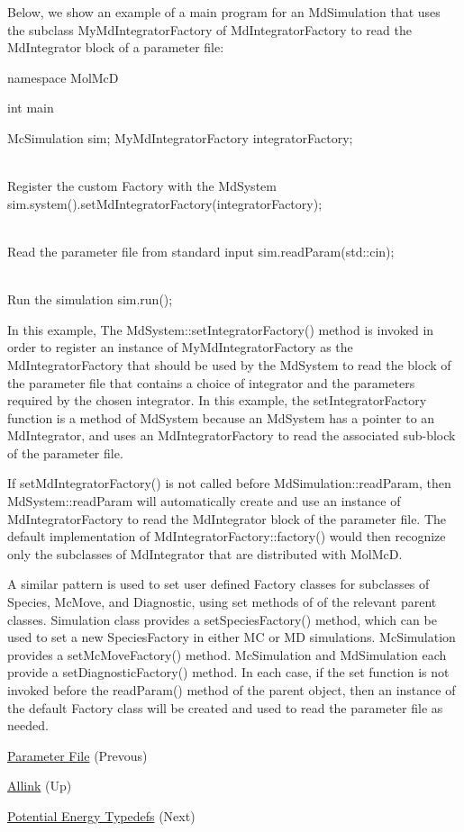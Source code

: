 \-Below, we show an example of a main program for an \-Md\-Simulation that uses the subclass \-My\-Md\-Integrator\-Factory of \-Md\-Integrator\-Factory to read the \-Md\-Integrator block of a parameter file\-: 
\begin{DoxyCode}
namespace MolMcD
{

   int main 
   {
      McSimulation          sim;
      MyMdIntegratorFactory integratorFactory;
 
      \\ Register the custom Factory with the MdSystem
      sim.system().setMdIntegratorFactory(integratorFactory);

      \\ Read the parameter file from standard input
      sim.readParam(std::cin);
  
      \\ Run the simulation
      sim.run();
  
   }

}
\end{DoxyCode}
 \-In this example, \-The \-Md\-System\-::set\-Integrator\-Factory() method is invoked in order to register an instance of \-My\-Md\-Integrator\-Factory as the \-Md\-Integrator\-Factory that should be used by the \-Md\-System to read the block of the parameter file that contains a choice of integrator and the parameters required by the chosen integrator. \-In this example, the set\-Integrator\-Factory function is a method of \-Md\-System because an \-Md\-System has a pointer to an \-Md\-Integrator, and uses an \-Md\-Integrator\-Factory to read the associated sub-\/block of the parameter file.

\-If set\-Md\-Integrator\-Factory() is not called before \-Md\-Simulation\-::read\-Param, then \-Md\-System\-::read\-Param will automatically create and use an instance of \-Md\-Integrator\-Factory to read the \-Md\-Integrator block of the parameter file. \-The default implementation of \-Md\-Integrator\-Factory\-::factory() would then recognize only the subclasses of \-Md\-Integrator that are distributed with \-Mol\-Mc\-D.

\-A similar pattern is used to set user defined \-Factory classes for subclasses of \-Species, \-Mc\-Move, and \-Diagnostic, using set methods of of the relevant parent classes. \-Simulation class provides a set\-Species\-Factory() method, which can be used to set a new \-Species\-Factory in either \-M\-C or \-M\-D simulations. \-Mc\-Simulation provides a set\-Mc\-Move\-Factory() method. \-Mc\-Simulation and \-Md\-Simulation each provide a set\-Diagnostic\-Factory() method. \-In each case, if the set function is not invoked before the read\-Param() method of the parent object, then an instance of the default \-Factory class will be created and used to read the parameter file as needed.


\begin{DoxyItemize}
\item \hyperlink{param_page}{\-Parameter \-File} (\-Prevous)  
\item \hyperlink{index}{\-Allink} (\-Up)  
\item \hyperlink{typedef_page}{\-Potential \-Energy \-Typedefs} (\-Next)  
\end{DoxyItemize}